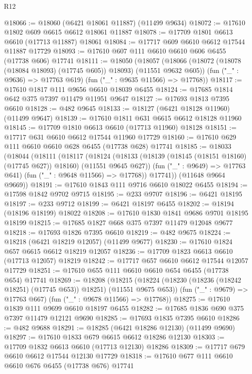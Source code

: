 \begin{lexlean}{R12}
\begin{coremodule}
@18066 := @18060 (@6421 @18061 @11887) (@11499 @9634)
@18072 := @17610 @1802 @609 @6615 @6612 @18061 @11887
@18078 := @17709 @1801 @6613 @6610 (@17713 @11887) @18061
@18084 := @17717 @609 @6610 @6612 @17544 @11887 @17729
@18093 := @17610 @607 @111 @6610 @6610 @606 @6455 (@17738 @606) @17741
@18111 := @18050
    (@18057
      (@18066 (@18072 (@18078 (@18084 @18093) (@17745 @605)) @18093) (@11551 @9632 @605))
      (fun ("_" : @9636) => @17763 @619)
      (fun ("_" : @9635 @11566) => @17768))
@18117 := @17610 @1817 @111 @9656 @6610 @18039 @6455
@18124 := @17685 @1814 @642 @375 @7397 @11479 @11951 @9647
@18127 := @17693 @1813 @7395 @6610
@18128 := @482 @9645
@18133 := @18127 (@6421 @18128 @11960) (@11499 @9647)
@18139 := @17610 @1811 @631 @6615 @6612 @18128 @11960
@18145 := @17709 @1810 @6613 @6610 (@17713 @11960) @18128
@18151 := @17717 @631 @6610 @6612 @17544 @11960 @17729
@18160 := @17610 @629 @111 @6610 @6610 @628 @6455 (@17738 @628) @17741
@18185 := @18033
    (@18044
      (@18111
        (@18117
          (@18124
            (@18133 (@18139 (@18145 (@18151 @18160) (@17745 @627)) @18160) (@11551 @9645 @627))
            (fun ("_" : @9649) => @17763 @641)
            (fun ("_" : @9648 @11566) => @17768))
          @17741))
      (@11648 @9664 @9669))
@18191 := @17610 @1843 @111 @9716 @6610 @18022 @6455
@18194 := @17598 @1842 @9702 @9715
@18195 := @233 @9707
@18196 := @6421 @18195
@18197 := @233 @9712
@18199 := @6421 @18197 @6455
@18202 := @18194 (@18196 @18199) @18022
@18208 := @17610 @1830 @1841 @9686 @9701 @18195 @18199
@18215 := @17685 @1827 @668 @375 @7397 @11479 @12048 @9677
@18218 := @17693 @1826 @7395 @6610
@18219 := @482 @9675
@18224 := @18218 (@6421 @18219 @12057) (@11499 @9677)
@18230 := @17610 @1824 @657 @6615 @6612 @18219 @12057
@18236 := @17709 @1823 @6613 @6610 (@17713 @12057) @18219
@18242 := @17717 @657 @6610 @6612 @17544 @12057 @17729
@18251 := @17610 @655 @111 @6610 @6610 @654 @6455 (@17738 @654) @17741
@18269 := @18208
    (@18215
      (@18224 (@18230 (@18236 (@18242 @18251) (@17745 @653)) @18251) (@11551 @9675 @653))
      (fun ("_" : @9679) => @17763 @667)
      (fun ("_" : @9678 @11566) => @17768))
@18275 := @17610 @1839 @111 @9699 @6610 @18197 @6455
@18282 := @17685 @1836 @690 @375 @7397 @11479 @12121 @9690
@18285 := @17693 @1835 @7395 @6610
@18286 := @482 @9688
@18291 := @18285 (@6421 @18286 @12130) (@11499 @9690)
@18297 := @17610 @1833 @679 @6615 @6612 @18286 @12130
@18303 := @17709 @1832 @6613 @6610 (@17713 @12130) @18286
@18309 := @17717 @679 @6610 @6612 @17544 @12130 @17729
@18318 := @17610 @677 @111 @6610 @6610 @676 @6455 (@17738 @676) @17741

\end{coremodule}
\end{lexlean}
